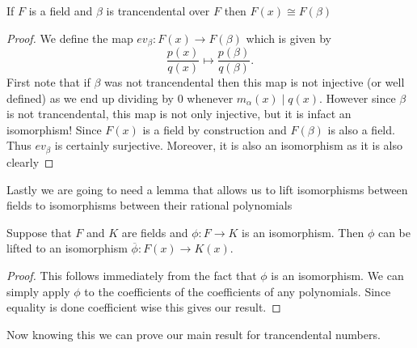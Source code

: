 \begin{lemma}\label{lemma:isotoquot}
  If $F$ is a field and $\beta$ is trancendental over $F$ then $F(x) \cong
  F(\beta)$ 
\end{lemma}
\begin{proof}
  We define the map $ev_{\beta}: F(x) \to F(\beta)$ which is given by 
\[
  \frac{p(x)}{q(x)} \mapsto \frac{p(\beta)}{q(\beta)}
  .\] 
  First note that if $\beta$ was not trancendental then this map is not injective
  (or well defined) as we end up dividing by 0 whenever $m_{\alpha}(x) \mid
  q(x)$. However since $\beta$ is not trancendental, this map is not only
  injective, but it is infact an isomorphism! Since $F(x)$ is a field by
  construction and $F(\beta)$ is also a field. Thus $ev_{\beta}$ is certainly
  surjective. Moreover, it is also an isomorphism as it is also clearly
\end{proof}

Lastly we are going to need a lemma that allows us to lift isomorphisms between
fields to isomorphisms between their rational polynomials

\begin{lemma}\label{lemma:lifttoquot}
 Suppose that $F$ and $K$ are fields and $\phi: F \to K$ is an isomorphism.
 Then $\phi$ can be lifted to an isomorphism $\overline{\phi}: F(x) \to K(x)$. 
\end{lemma}
\begin{proof}
  This follows immediately from the fact that $\phi$ is an isomorphism. We can
  simply apply $\phi$ to the coefficients of the coefficients of any
  polynomials. Since equality is done coefficient wise this gives our result.
\end{proof}

Now knowing this we can prove our main result for trancendental numbers.

